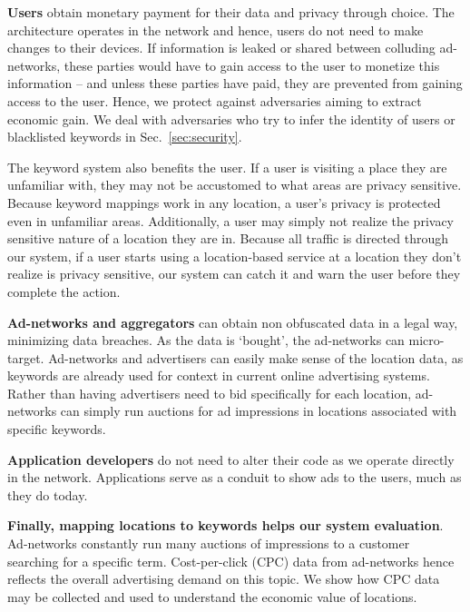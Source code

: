 \textbf{Users} obtain monetary payment for their data and privacy through choice.
The architecture operates in the network and hence, users do not need to make changes to their devices.
If information is leaked or shared between colluding ad-networks, these parties would have to gain access to the user to monetize this information -- and unless these parties have paid, they are prevented from gaining access to the user.
Hence, we protect against adversaries aiming to extract economic gain. 
We deal with adversaries who try to infer the identity of users or blacklisted keywords in Sec.~\ref{sec:security}.

The keyword system also benefits the user.
If a user is visiting a place they are unfamiliar with, they may not be accustomed to what areas are privacy sensitive.
Because keyword mappings work in any location, a user's privacy is protected even in unfamiliar areas.
Additionally, a user may simply not realize the privacy sensitive nature of a location they are in.
Because all traffic is directed through our system, if a user starts using a location-based service at a location they don't realize is privacy sensitive, our system can catch it and warn the user before they complete the action.

\textbf{Ad-networks and aggregators} can obtain non obfuscated data in a legal way, minimizing data breaches. As the data is `bought', the ad-networks can micro-target. 
Ad-networks and advertisers can easily make sense of the location data, as keywords are already used for context in current online advertising systems.
Rather than having advertisers need to bid specifically for each location, ad-networks can simply run auctions for ad impressions in locations associated with specific keywords. 

\textbf{Application developers} do not need to alter their code as we operate directly in the network. Applications serve as a conduit to show ads to the users, much as they do today. 



\textbf{Finally, mapping locations to keywords helps our system evaluation}.
Ad-networks constantly run many auctions of impressions to a customer searching for a specific term. Cost-per-click (CPC) data from ad-networks hence reflects the overall advertising demand on this topic. We show how CPC data may be collected and used to understand the economic value of locations.



